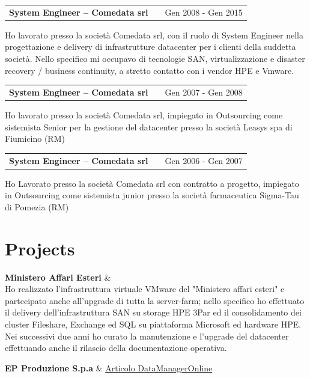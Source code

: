 \documentclass[a4paper,12pt]{article}
\makeatletter
\newenvironment{jobshort}[2]
    {
    \begin{tabularx}{\linewidth}{@{}l X r@{}}
    \textbf{#1} & \hfill &  #2 \\[3.75pt]
    \end{tabularx}
    }
    {
    }
\makeatother
\begin{document}
\begin{jobshort}{System Engineer – Comedata srl}{Gen 2008 - Gen 2015}
Ho lavorato presso la società Comedata srl, con il ruolo di System Engineer nella progettazione e delivery di infrastrutture datacenter per i clienti della suddetta società. Nello speciﬁco mi occupavo di tecnologie SAN, virtualizzazione e disaster recovery / business continuity, a stretto contatto con i vendor HPE e Vmware.
\end{jobshort}

\vspace{6pt}

\begin{jobshort}{System Engineer – Comedata srl}{Gen 2007 - Gen 2008}
Ho lavorato presso la società Comedata srl, impiegato in Outsourcing come sistemista Senior per la gestione del datacenter presso la società Leasys spa di Fiumicino (RM)
\end{jobshort}

\vspace{6pt}

\begin{jobshort}{System Engineer – Comedata srl}{Gen 2006 - Gen 2007}
Ho Lavorato presso la società Comedata srl con contratto a progetto, impiegato in Outsourcing come sistemista junior presso la società farmaceutica Sigma-Tau di Pomezia (RM)
\end{jobshort}

\section{Projects}

\textbf{Ministero Affari Esteri} & \\

Ho realizzato l'infrastruttura virtuale VMware del "Ministero affari esteri" e partecipato anche all'upgrade di tutta la server-farm; nello specifico ho effettuato il delivery dell'infrastruttura SAN su storage HPE 3Par ed il consolidamento dei cluster Fileshare, Exchange ed SQL su piattaforma Microsoft ed hardware HPE. 
Nei successivi due anni ho curato la manutenzione e l'upgrade del datacenter effettuando anche il rilascio della documentazione operativa.

\vspace{6pt}

\textbf{EP Produzione S.p.a} & \hfill \href{https://www.datamanager.it/2019/03/ep-produzione-sceglie-arcserve-udp-e-i-servizi-comedata/}{Articolo DataManagerOnline} \\
\end{document}
